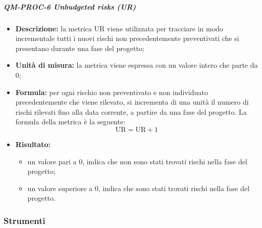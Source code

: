 			\subparagraph{QM-PROC-6 Unbudgeted risks (UR)}
			\begin{itemize}
				\item \textbf{Descrizione:} 
				la metrica UR viene utilizzata per tracciare in modo incrementale tutti i nuovi rischi non precedentemente preventivati che si presentano durante una fase del progetto;

				\item \textbf{Unità di misura:} 
				la metrica viene espressa con un valore intero che parte da 0;

				\item \textbf{Formula:} 
				per ogni rischio non preventivato e non individuato precedentemente che viene rilevato, si incrementa di una unità il numero di rischi rilevati fino alla data corrente, a partire da una fase del progetto.
				La formula della metrica è la seguente:
				\[
					\text{UR} = \text{UR} + 1
				\]
				
				\item \textbf{Risultato:} 
				\begin{itemize}
					\item un valore pari a 0, indica che non sono stati trovati rischi nella fase del progetto;
					\item un valore superiore a 0, indica che sono stati trovati rischi nella fase del progetto.
				\end{itemize}		
			\end{itemize}

	\subsubsection{Strumenti}

